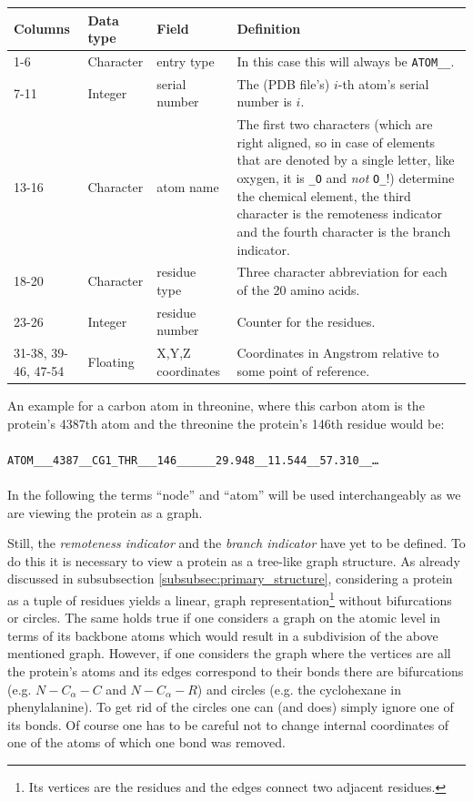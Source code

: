 \documentclass[12pt]{article}
\theoremstyle{definition}\newtheorem*{definition}{Definition}
\theoremstyle{definition}\newtheorem*{remark}{Remark}
\begin{document}
\begin{center}
    \begin{tabular}{ | p{1.45cm} | l | l | p{5cm} |}
    \hline
    Columns & Data type & Field & Definition \\ \hline
    1-6 & Character & entry type & In this case this will always be \texttt{ATOM\_\_}. \\ \hline
    7-11 & Integer & serial number & The (PDB file's) $i$-th atom's serial number is $i$. \\ \hline
    13-16 & Character & atom name & The first two characters (which are right aligned, so in case of elements that are denoted by a single letter, like oxygen, it is \texttt{\_O} and \textit{not} \texttt{O\_}!) determine the chemical element, the third character is the remoteness indicator and the fourth character is the branch indicator.\\\hline
    18-20 & Character & residue type & Three character abbreviation for each of the 20 amino acids. \\\hline
    23-26 & Integer & residue number & Counter for the residues. \\\hline
    31-38, 39-46, 47-54 & Floating & X,Y,Z coordinates & Coordinates in Angstrom relative to some point of reference. \\\hline
    \end{tabular}
\end{center}

An example for a carbon atom in threonine, where this carbon atom is the protein's 4387th atom and the threonine the protein's 146th residue would be:
\\~\\
\texttt{ATOM\_\_\_4387\_\_CG1\_THR\_\_\_146\_\_\_\_\_\_29.948\_\_11.544\_\_57.310\_\_\dots}
\\~\\
In the following the terms ``node'' and ``atom'' will be used interchangeably as we are viewing the protein as a graph. 

Still, the \textit{remoteness indicator} and the \textit{branch indicator} have yet to be defined. To do this it is necessary to view a protein as a tree-like graph structure. As already discussed in subsubsection \ref{subsubsec:primary_structure}, considering a protein as a tuple of residues yields a linear, graph representation\footnote{Its vertices are the residues and the edges connect two adjacent residues.} without bifurcations or circles. The same holds true if one considers a graph on the atomic level in terms of its backbone atoms which would result in a subdivision of the above mentioned graph. However, if one considers the graph where the vertices are all the protein's atoms and its edges correspond to their bonds there are bifurcations (e.g. $N-C_\alpha-C$ and $N-C_\alpha-R$) and circles (e.g. the cyclohexane in phenylalanine). To get rid of the circles one can (and does) simply ignore one of its bonds. Of course one has to be careful not to change internal coordinates of one of the atoms of which one bond was removed.
\end{document}
